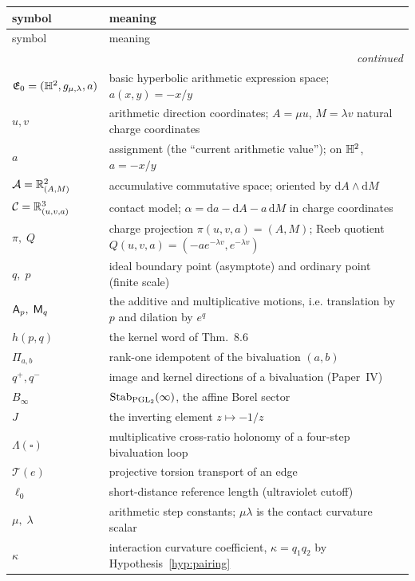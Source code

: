 {\small
\renewcommand{\arraystretch}{1.2}%
\begin{longtable}{@{}ll@{}}
\toprule
symbol & meaning \\
\midrule
\endfirsthead
\toprule
symbol & meaning \\
\midrule
\endhead
\midrule
\multicolumn{2}{r}{\emph{continued}}\\
\endfoot
\bottomrule
\endlastfoot
$\mathfrak{E}_0=(\mathbb{H}^2,g_{\mu,\lambda},a)$ & basic hyperbolic arithmetic expression space;
$a(x,y)=-x/y$ \\
$u,v$ & arithmetic direction coordinates; $A=\mu u$, $M=\lambda v$ natural
charge coordinates \\
$a$ & assignment (the ``current arithmetic value''); on $\mathbb{H}^2$, $a=-x/y$ \\
$\mathcal{A}=\mathbb{R}^2_{(A,M)}$ & accumulative commutative space; oriented by
$\mathrm dA\wedge\mathrm dM$ \\
$\mathcal{C}=\mathbb{R}^3_{(u,v,a)}$ & contact model; $\alpha=\mathrm da-\mathrm dA-a\,
\mathrm dM$ in charge coordinates \\
$\pi,\;Q$ & charge projection $\pi(u,v,a)=(A,M)$; Reeb quotient
$Q(u,v,a)=(-ae^{-\lambda v},e^{-\lambda v})$ \\
$q,\;p$ & ideal boundary point (asymptote) and ordinary point (finite scale) \\
$\mathsf A_p,\;\mathsf M_q$ & the additive and multiplicative motions, i.e. translation by
$p$ and dilation by $e^{q}$ \\
$h(p,q)$ & the kernel word of Thm.~8.6 \\
$\Pi_{a,b}$ & rank-one idempotent of the bivaluation $(a,b)$ \\
$q^+,q^-$ & image and kernel directions of a bivaluation (Paper~IV) \\
$B_\infty$ & $\operatorname{Stab}_{\operatorname{PGL}_2}(\infty)$, the affine Borel sector \\
$J$ & the inverting element $z\mapsto -1/z$ \\
$\Lambda(\square)$ & multiplicative cross-ratio holonomy of a four-step
bivaluation loop \\
$\mathcal T(e)$ & projective torsion transport of an edge \\
$\ell_0$ & short-distance reference length (ultraviolet cutoff) \\
$\mu,\;\lambda$ & arithmetic step constants; $\mu\lambda$ is the contact
curvature scalar \\
$\kappa$ & interaction curvature coefficient, $\kappa=q_1q_2$ by
Hypothesis~\ref{hyp:pairing} \\
\end{longtable}}

